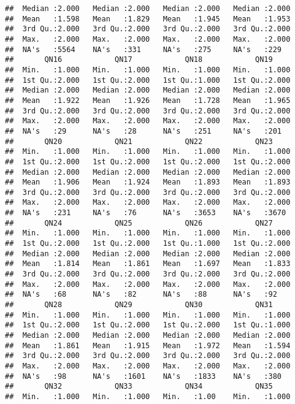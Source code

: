 \documentclass[
]{article}
\begin{document}
\begin{verbatim}
##  Median :2.000   Median :2.000   Median :2.000   Median :2.000  
##  Mean   :1.598   Mean   :1.829   Mean   :1.945   Mean   :1.953  
##  3rd Qu.:2.000   3rd Qu.:2.000   3rd Qu.:2.000   3rd Qu.:2.000  
##  Max.   :2.000   Max.   :2.000   Max.   :2.000   Max.   :2.000  
##  NA's   :5564    NA's   :331     NA's   :275     NA's   :229    
##       QN16            QN17            QN18            QN19      
##  Min.   :1.000   Min.   :1.000   Min.   :1.000   Min.   :1.000  
##  1st Qu.:2.000   1st Qu.:2.000   1st Qu.:1.000   1st Qu.:2.000  
##  Median :2.000   Median :2.000   Median :2.000   Median :2.000  
##  Mean   :1.922   Mean   :1.926   Mean   :1.728   Mean   :1.965  
##  3rd Qu.:2.000   3rd Qu.:2.000   3rd Qu.:2.000   3rd Qu.:2.000  
##  Max.   :2.000   Max.   :2.000   Max.   :2.000   Max.   :2.000  
##  NA's   :29      NA's   :28      NA's   :251     NA's   :201    
##       QN20            QN21            QN22            QN23      
##  Min.   :1.000   Min.   :1.000   Min.   :1.000   Min.   :1.000  
##  1st Qu.:2.000   1st Qu.:2.000   1st Qu.:2.000   1st Qu.:2.000  
##  Median :2.000   Median :2.000   Median :2.000   Median :2.000  
##  Mean   :1.906   Mean   :1.924   Mean   :1.893   Mean   :1.893  
##  3rd Qu.:2.000   3rd Qu.:2.000   3rd Qu.:2.000   3rd Qu.:2.000  
##  Max.   :2.000   Max.   :2.000   Max.   :2.000   Max.   :2.000  
##  NA's   :231     NA's   :76      NA's   :3653    NA's   :3670   
##       QN24            QN25            QN26            QN27      
##  Min.   :1.000   Min.   :1.000   Min.   :1.000   Min.   :1.000  
##  1st Qu.:2.000   1st Qu.:2.000   1st Qu.:1.000   1st Qu.:2.000  
##  Median :2.000   Median :2.000   Median :2.000   Median :2.000  
##  Mean   :1.814   Mean   :1.861   Mean   :1.697   Mean   :1.833  
##  3rd Qu.:2.000   3rd Qu.:2.000   3rd Qu.:2.000   3rd Qu.:2.000  
##  Max.   :2.000   Max.   :2.000   Max.   :2.000   Max.   :2.000  
##  NA's   :68      NA's   :82      NA's   :88      NA's   :92     
##       QN28            QN29            QN30            QN31      
##  Min.   :1.000   Min.   :1.000   Min.   :1.000   Min.   :1.000  
##  1st Qu.:2.000   1st Qu.:2.000   1st Qu.:2.000   1st Qu.:1.000  
##  Median :2.000   Median :2.000   Median :2.000   Median :2.000  
##  Mean   :1.861   Mean   :1.915   Mean   :1.972   Mean   :1.594  
##  3rd Qu.:2.000   3rd Qu.:2.000   3rd Qu.:2.000   3rd Qu.:2.000  
##  Max.   :2.000   Max.   :2.000   Max.   :2.000   Max.   :2.000  
##  NA's   :98      NA's   :1601    NA's   :1833    NA's   :380    
##       QN32            QN33            QN34            QN35      
##  Min.   :1.000   Min.   :1.000   Min.   :1.00    Min.   :1.000  

\end{verbatim}
\end{document}
